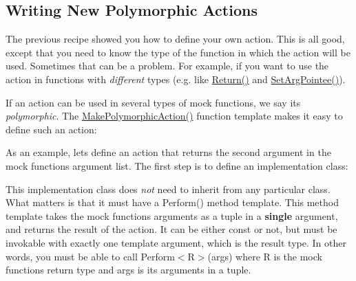 \subsection*{Writing New Polymorphic Actions}

The previous recipe showed you how to define your own action. This is all good, except that you need to know the type of the function in which the action will be used. Sometimes that can be a problem. For example, if you want to use the action in functions with {\itshape different} types (e.\+g. like {\ttfamily \mbox{\hyperlink{namespacetesting_af6d1c13e9376c77671e37545cd84359c}{Return()}}} and {\ttfamily \mbox{\hyperlink{namespacetesting_a5740a5033b88c37666fcd09a269d123f}{Set\+Arg\+Pointee()}}}).

If an action can be used in several types of mock functions, we say it\textquotesingle{}s {\itshape polymorphic}. The {\ttfamily \mbox{\hyperlink{namespacetesting_a36bd06c5ea972c6df0bd9f40a7a94c65}{Make\+Polymorphic\+Action()}}} function template makes it easy to define such an action\+:


\begin{DoxyCode}{0}
\DoxyCodeLine{}
\DoxyCodeLine{}
\end{DoxyCode}


As an example, let\textquotesingle{}s define an action that returns the second argument in the mock function\textquotesingle{}s argument list. The first step is to define an implementation class\+:


\begin{DoxyCode}{0}
\DoxyCodeLine{  \}}
\DoxyCodeLine{\};}
\end{DoxyCode}


This implementation class does {\itshape not} need to inherit from any particular class. What matters is that it must have a {\ttfamily Perform()} method template. This method template takes the mock function\textquotesingle{}s arguments as a tuple in a {\bfseries{single}} argument, and returns the result of the action. It can be either {\ttfamily const} or not, but must be invokable with exactly one template argument, which is the result type. In other words, you must be able to call {\ttfamily Perform$<$R$>$(args)} where {\ttfamily R} is the mock function\textquotesingle{}s return type and {\ttfamily args} is its arguments in a tuple.

